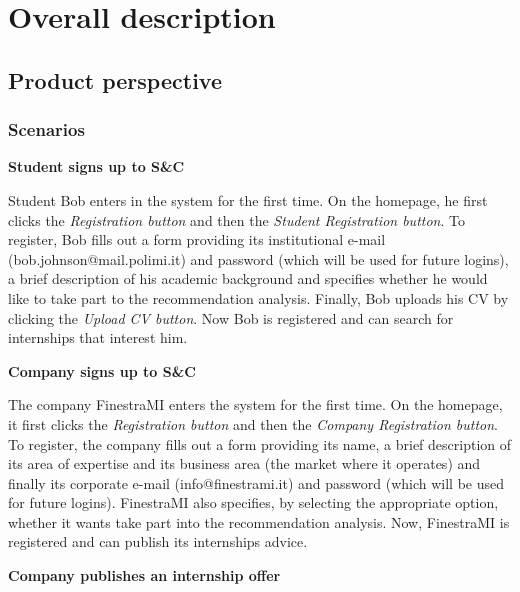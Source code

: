 \chapter{Overall description}
	\section{Product perspective}
				\subsection{Scenarios}
		\textbf{Student signs up to S\&C}
		\begin{flushleft}
			Student Bob enters in the system for the first time. On the homepage, he first clicks the \emph{Registration button} and then the \emph{Student Registration button}. To register, Bob fills out a form providing its institutional e-mail (bob.johnson@mail.polimi.it) and password (which will be used for future logins), a brief description of his academic background and specifies whether he would like to take part to the recommendation analysis. Finally, Bob uploads his CV by clicking the \emph{Upload CV button}. Now Bob is registered and can search for internships that interest him.
		\end{flushleft}
		\textbf{Company signs up to S\&C}
		\begin{flushleft}
			The company FinestraMI enters the system for the first time. On the homepage, it first clicks the \emph{Registration button} and then the \emph{Company Registration button}. To register, the company fills out a form providing its name, a brief description of its area of expertise and its business area (the market where it operates) and finally its corporate e-mail (info@finestrami.it) and password (which will be used for future logins). FinestraMI also specifies, by selecting the appropriate option, whether it wants take part into the recommendation analysis. Now, FinestraMI is registered and can publish its internships advice.
		\end{flushleft}
		\textbf{Company publishes an internship offer}
